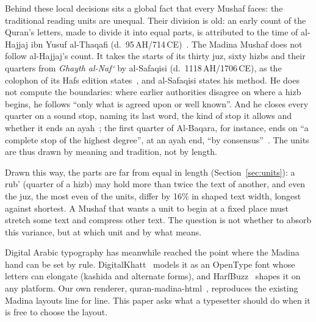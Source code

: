 \documentclass[sigconf,nonacm]{acmart}
\begin{document}
Behind these local decisions sits a global fact that every Mushaf faces: the traditional reading units are unequal. Their division is old: an early count of the Quran's letters, made to divide it into equal parts, is attributed to the time of al-Hajjaj ibn Yusuf al-Thaqafi (d.~95\,AH/714\,CE)~\cite{ibnabidawud,ibnkathir}. The Madina Mushaf does not follow al-Hajjaj's count. It takes the starts of its thirty juz, sixty hizbs and their quarters from \emph{Ghayth al-Naf`} by al-Safaqisi (d.~1118\,AH/1706\,CE), as the colophon of its Hafs edition states~\cite{kfgqpc1405}, and al-Safaqisi states his method. He does not compute the boundaries: where earlier authorities disagree on where a hizb begins, he follows ``only what is agreed upon or well known''. And he closes every quarter on a sound stop, naming its last word, the kind of stop it allows and whether it ends an ayah~\cite[p.~25]{safaqisi}; the first quarter of Al-Baqara, for instance, ends on ``a complete stop of the highest degree'', at an ayah end, ``by consensus''~\cite[p.~60]{safaqisi}. The units are thus drawn by meaning and tradition, not by length.

Drawn this way, the parts are far from equal in length (Section~\ref{sec:units}): a rub' (quarter of a hizb) may hold more than twice the text of another, and even the juz, the most even of the units, differ by 16\% in shaped text width, longest against shortest. A Mushaf that wants a unit to begin at a fixed place must stretch some text and compress other text. The question is not whether to absorb this variance, but at which unit and by what means.

Digital Arabic typography has meanwhile reached the point where the Madina hand can be set by rule. DigitalKhatt~\cite{digitalkhatt,anane2021} models it as an OpenType font whose letters can elongate (kashida and alternate forms), and HarfBuzz~\cite{harfbuzz} shapes it on any platform. Our own renderer, quran-madina-html~\cite{qmh}, reproduces the existing Madina layouts line for line. This paper asks what a typesetter should do when it is free to choose the layout.
\end{document}
